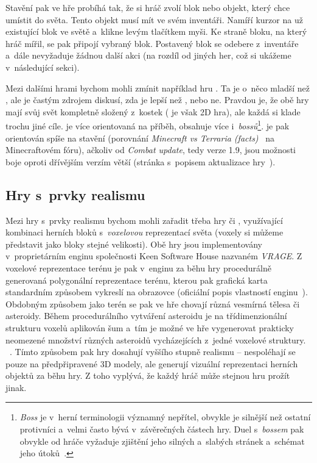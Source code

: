 \FloatBarrier

Stavění pak ve hře probíhá tak, že si hráč zvolí blok nebo objekt, který chce umístit do světa. Tento objekt musí mít ve svém inventáři. Namíří kurzor na už existující blok ve světě a~klikne levým tlačítkem myši. Ke straně bloku, na který hráč mířil, se pak připojí vybraný blok. Postavený blok se odebere z~inventáře a~dále nevyžaduje žádnou další akci (na rozdíl od jiných her, což si ukážeme v~následující sekci).


Mezi dalšími hrami bychom mohli zmínit například hru \TE{}. Ta je o~něco mladší než \MC{}, ale je častým zdrojem diskusí, zda je lepší než \MC{}, nebo ne. Pravdou je, že obě hry mají svůj svět kompletně složený z~kostek (\TE{} je však 2D hra), ale každá si klade trochu jiné cíle. \TE{} je více orientovaná na příběh, obsahuje více \NPC{} i~\textit{bossů}\footnote{\textit{Boss} je v~herní terminologii významný nepřítel, obvykle je silnější než ostatní protivníci a~velmi často bývá v~závěrečných částech hry. Duel s~\textit{bossem} pak obvykle od hráče vyžaduje zjištění jeho silných a~slabých stránek a~schémat jeho útoků~\citep{intro_boss}.}. \MC{} je pak orientován spíše na stavění (porovnání \textit{Minecraft vs Terraria (facts)}~\citep{mc_te_comparsion} na Minecraftovém fóru), ačkoliv od \textit{Combat update}, tedy verze 1.9, jsou možnosti boje oproti dřívějším verzím větší (stránka s~popisem aktualizace hry~\citep{mc_combat}). 


\subsection{Hry s~prvky realismu}

Mezi hry s~prvky realismu bychom mohli zařadit třeba hry \SE{} či \ME{}, využívající kombinaci herních bloků s~\textit{voxelovou} reprezentací světa (voxely si můžeme představit jako bloky stejné velikosti). Obě hry jsou implementovány v~proprietárním enginu společnosti Keen Software House nazvaném \textit{VRAGE}\texttrademark{}. Z voxelové reprezentace terénu je pak v~enginu za běhu hry procedurálně generovaná polygonální reprezentace terénu, kterou pak grafická karta standardním způsobem vykreslí na obrazovce (oficiální popis vlastností enginu~\citep{vrage}). Obdobným způsobem jako terén se pak ve hře \SE{} chovají různá vesmírná tělesa či asteroidy. Během procedurálního vytváření asteroidu je na třídimenzionální strukturu voxelů aplikován šum a~tím je možné ve hře vygenerovat prakticky neomezené množství různých asteroidů vycházejících z~jedné voxelové struktury. ~\citep{rosa_blog}. Tímto způsobem pak hry dosahují vyššího stupně realismu -- nespoléhají se pouze na předpřipravené 3D modely, ale generují vizuální reprezentaci herních objektů za běhu hry. Z toho vyplývá, že každý hráč může stejnou hru prožít jinak. 

